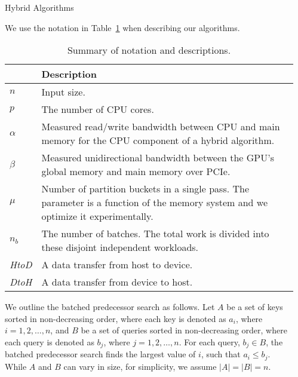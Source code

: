 \documentclass[final]{beamer}
\newlength{\sepwidth}
\newlength{\colwidth}
\newcommand{\separatorcolumn}{\begin{column}{\sepwidth}\end{column}}
\def\DtoH{\textit{DtoH}}
\def\HtoD{\textit{HtoD}}
\begin{document}
\begin{frame}[t]
\begin{columns}[t]
\separatorcolumn

\begin{column}{\colwidth}

  \begin{block}{Hybrid Algorithms}

   We use the notation in Table~\ref{tab:notation} when describing our algorithms. 
   \begin{table}[htp]
   \centering
   \begin{footnotesize}
   \caption{Summary of notation and descriptions.}\label{tab:notation}
   \begin{tabularx}{\columnwidth}{|l|X|} \hline
      & Description\\ \hline
   $n$& Input size.\\ \hline
   $p$ & The number of CPU cores.\\\hline
   $\alpha$ & Measured read/write bandwidth between CPU and main memory for the CPU component of a hybrid algorithm. \\\hline
   $\beta$  & Measured unidirectional bandwidth between the GPU's global memory and main memory over PCIe.\\\hline
   $\mu$ & Number of partition buckets in a single pass.  The parameter is a function of the memory system and we optimize it experimentally.  \\\hline
   $n_b$ & The number of batches. The total work is divided into these disjoint independent workloads. \\\hline
   \HtoD & A data transfer from host to device.\\\hline
   \DtoH & A data transfer from device to host.\\\hline
   \end{tabularx}
   \end{footnotesize}
   \end{table}


   
   We outline the batched predecessor search as follows. Let $A$ be a set of keys sorted in non-decreasing order,  
   where each key is denoted as $a_i$, where $i=1, 2,\ldots,n$, and $B$ be a set of queries sorted in non-decreasing order, 
   where each query is denoted as $b_j$, where $j=1, 2,\ldots,n$. For each query, $b_j\in B$, the batched predecessor search 
   finds the largest value of $i$, such that $a_i\leq b_j$. While $A$ and $B$ can vary in size, for simplicity, we assume $|A|=|B|=n$.



\end{block}
\end{column}
\end{columns}
\end{frame}
\end{document}
